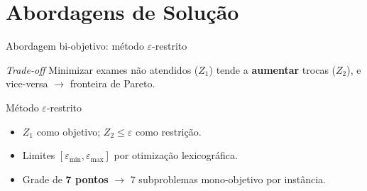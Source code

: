 \section{Abordagens de Solução}

\begin{frame}{Abordagem bi-objetivo: método $\varepsilon$-restrito}

    \begin{block}{\textit{Trade-off}}
        Minimizar exames não atendidos ($Z_1$) tende a \textbf{aumentar} trocas ($Z_2$), e vice-versa $\rightarrow$ fronteira de Pareto.
    \end{block}

    \begin{block}{Método $\varepsilon$-restrito \cite{Haimes_Wismer_1971,Saez-Aguado_Trandafir_2018}}
        \begin{itemize}
            \item $Z_1$ como objetivo; $Z_2 \leq \varepsilon$ como restrição.
            \item Limites $[\varepsilon_{\min},\varepsilon_{\max}]$ por otimização lexicográfica.
            \item Grade de \textbf{7 pontos} $\rightarrow$ 7 subproblemas mono-objetivo por instância.
        \end{itemize}
    \end{block}
\end{frame}

